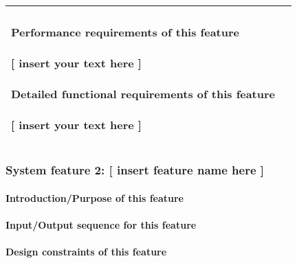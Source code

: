 \documentclass[letterpaper, 10pt, draftclsnofoot, onecolumn]{IEEEtran}
\begin{document}
{{\begin{flushleft}
\begin{supertabular}{|m{3.17056in}|m{3.1740599in}|}
\paragraph[Performance requirements of this
feature]{\rmfamily\bfseries\color{black}
Performance requirements of this feature}
{\color{black} [ insert your text here ]}

\paragraph[Detailed functional requirements of this
feature]{\rmfamily\bfseries\color{black}
Detailed functional requirements of this feature}




\paragraph[]{\rmfamily\bfseries\color{black} }

\color{black} [ insert your text here ]\\\hline
\end{supertabular}
\end{flushleft}

\bigskip

\subsubsection[System feature 2: [ insert feature name here
{]}]{\rmfamily\bfseries\color{black} System
feature 2: [ insert feature name here ]}
\paragraph[Introduction/Purpose of this feature]
{\rmfamily\bfseries\color{black}Introduction/Purpose of this feature}

\paragraph[Input/Output sequence for this feature]{\rmfamily\bfseries\color{black}Input/Output sequence for this feature}

\paragraph[Design constraints of this
feature]{\rmfamily\bfseries\color{black} Design
constraints of this feature}

}}
\end{document}
